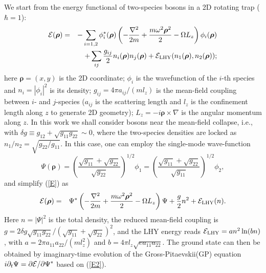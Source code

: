 \documentclass[reprint,aps,prl,twocolumn,superscriptaddress]{revtex4-1}
\begin{document}
We start from the energy functional of two-species bosons in a 2D rotating trap ($\hbar=1$):
\begin{eqnarray}
\cal{E}(\bm{\rho})&=&-\sum_{i=1,2}  \phi_i^{*}(\bm{\rho})\left( -\frac{\nabla^2}{2m} + \frac{m\omega^2 \bm{\rho}^2}{2} - \Omega L_z\right) \phi_i(\bm{\rho}) \nonumber\\
&&+ \sum_{ij}\frac{g_{ij}}{2}n_i(\bm{\rho})n_j(\bm{\rho})+ {\cal E}_{\rm LHY}(n_1(\bm{\rho}),n_2(\bm{\rho}));\label{E}
\end{eqnarray}
here $\bm{\bm{\rho}}=(x,y)$ is the 2D coordinate; $\phi_i$ is the wavefunction of the $i$-th species and $n_i=|\phi_i|^2$ is its density; $g_{ij}=4\pi a_{ij}/(ml_z)$ is the mean-field coupling between $i$- and $j$-species ($a_{ij}$ is the scattering length and $l_z$ is the confinement length along $z$ to generate 2D geometry); %
$L_z=-i \bm{\rho}\times \nabla $ is the angular momentum along $z$. In this work we shall consider bosons near the mean-field collapse, i.e., with $\delta g\equiv g_{12}+ \sqrt{g_{11}g_{22}}\sim 0$, where the two-species densities are locked as $n_1/n_2=\sqrt{g_{22}/g_{11}}$\cite{Petrov2015}. In this case, one can employ the single-mode wave-function 
\begin{equation}
\Psi(\bm{\rho})=\left( \frac{\sqrt{g_{11}}+\sqrt{g_{22}}}{\sqrt{g_{22}}}\right)^{1/2} \phi_1 = \left( \frac{\sqrt{g_{11}}+\sqrt{g_{22}}}{\sqrt{g_{11}}}\right)^{1/2} \phi_2,
\end{equation}
and simplify (\ref{E}) as
\begin{eqnarray}
\cal{E}(\bm{\rho})&=&\Psi^{*}\left( -\frac{\nabla^2}{2m} + \frac{m\omega^2 \bm{\rho}^2}{2} - \Omega L_z\right)  \Psi + \frac{g}{2}n^2+ {\cal E}_{\rm LHY}(n). \nonumber\\ \label{E2}
\end{eqnarray}
Here  $n=|\Psi|^2$ is the total density, the reduced mean-field coupling is $g=2\delta g \sqrt{g_{11}g_{22}}/(\sqrt{g_{11}}+\sqrt{g_{22}})^2$, and the LHY energy reads ${\cal E}_{\rm LHY}=an^2 \ln(bn)$, with $a=2\pi a_{11}a_{22}/(ml_z^2)$ and $b=4\pi l_z \sqrt{ea_{11}a_{22}}$\citep{Petrov_2, Zin}. The ground state  can then be  obtained by imaginary-time evolution of the Gross-Pitaevskii(GP) equation $i\partial_t\Psi=\partial {\cal{E}}/\partial \Psi ^*$ based on (\ref{E2}). 
\end{document}
